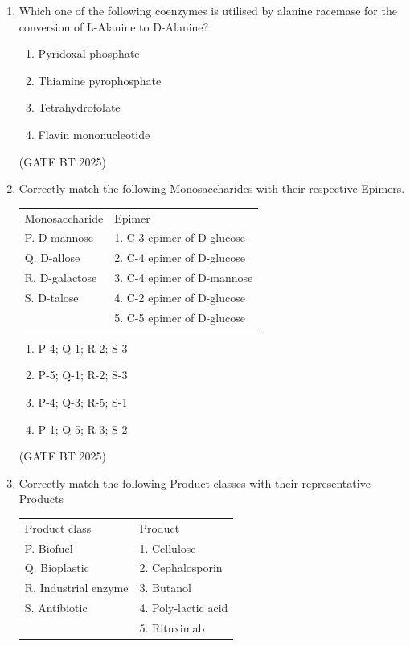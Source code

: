 \documentclass[journal,12pt,onecolumn]{IEEEtran}
\theoremstyle{remark}
\begin{document}
\begin{enumerate}
\item Which one of the following coenzymes is utilised by alanine racemase for the conversion of L-Alanine to D-Alanine?  
\begin{multicols}{2}
\begin{enumerate}
    \item Pyridoxal phosphate
    \item Thiamine pyrophosphate
    \item Tetrahydrofolate
    \item Flavin mononucleotide
\end{enumerate}  
\end{multicols}
\hfill (GATE BT 2025)

\item Correctly match the following Monosaccharides with their respective Epimers.  

\begin{tabular}{ll}
Monosaccharide & Epimer \\
P. D-mannose & 1. C-3 epimer of D-glucose \\
Q. D-allose & 2. C-4 epimer of D-glucose \\
R. D-galactose & 3. C-4 epimer of D-mannose \\
S. D-talose & 4. C-2 epimer of D-glucose \\
 & 5. C-5 epimer of D-glucose
\end{tabular}  

\begin{enumerate}
    \item P-4; Q-1; R-2; S-3
    \item P-5; Q-1; R-2; S-3
    \item P-4; Q-3; R-5; S-1
    \item P-1; Q-5; R-3; S-2
\end{enumerate}  
\hfill (GATE BT 2025)

\item Correctly match the following Product classes with their representative Products  

\begin{tabular}{ll}
Product class & Product \\
P. Biofuel & 1. Cellulose \\
Q. Bioplastic & 2. Cephalosporin \\
R. Industrial enzyme & 3. Butanol \\
S. Antibiotic & 4. Poly-lactic acid \\
 & 5. Rituximab
\end{tabular}  


\end{enumerate}
\end{document}
